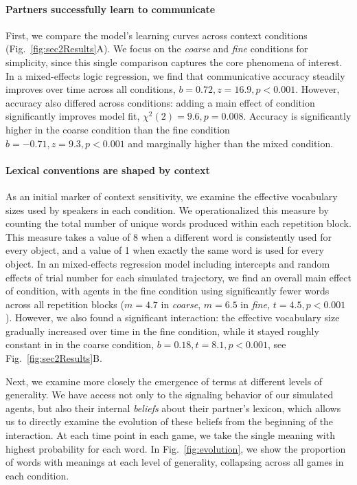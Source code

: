 \paragraph{Partners successfully learn to communicate}

First, we compare the model's learning curves across context conditions (Fig.~\ref{fig:sec2Results}A). 
We focus on the \emph{coarse} and \emph{fine} conditions for simplicity, since this single comparison captures the core phenomena of interest.
In a mixed-effects logic regression, we find that communicative accuracy steadily improves over time across all conditions, $b=0.72, z = 16.9, p<0.001$.
However, accuracy also differed across conditions: adding a main effect of condition significantly improves model fit, $\chi^2(2) = 9.6, p = 0.008$. 
Accuracy is significantly higher in the coarse condition than the fine condition $b=-0.71, z=9.3, p <0.001$ and marginally higher than the mixed condition.

\paragraph{Lexical conventions are shaped by context}

As an initial marker of context sensitivity, we examine the effective vocabulary sizes used by speakers in each condition.
We operationalized this measure by counting the total number of unique words produced within each repetition block.
This measure takes a value of 8 when a different word is consistently used for every object, and a value of 1 when exactly the same word is used for every object.
In an mixed-effects regression model including intercepts and random effects of trial number for each simulated trajectory, we find an overall main effect of condition, with agents in the fine condition using significantly fewer words across all repetition blocks ($m = 4.7$ in \emph{coarse}, $m=6.5$ in \emph{fine,} $t = 4.5, p < 0.001$).
However, we also found a significant interaction: the effective vocabulary size gradually increased over time in the fine condition, while it stayed roughly constant in in the coarse condition, $b = 0.18, t = 8.1, p < 0.001$, see Fig.~\ref{fig:sec2Results}B.

Next, we examine more closely the emergence of terms at different levels of generality.
We have access not only to the signaling behavior of our simulated agents, but also their internal \emph{beliefs} about their partner's lexicon, which allows us to directly examine the evolution of these beliefs from the beginning of the interaction.
At each time point in each game, we take the single meaning with highest probability for each word.
In Fig.~\ref{fig:evolution}, we show the proportion of words with meanings at each level of generality, collapsing across all games in each condition.


